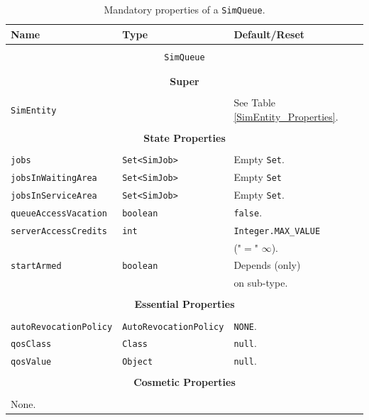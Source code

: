 \begin{table}[!htbp]
\caption{Mandatory properties of a \lstinline|SimQueue|.}
\label{SimQueue_Properties}
\begin{center}
\begin{tabular}{|l|l|l|}
\hline
{\bf Name} & {\bf Type} & {\bf Default/Reset} \\
\hline
\multicolumn{3}{|c|}{} \\
\multicolumn{3}{|c|}{\lstinline[basicstyle=\large]{SimQueue}} \\
\multicolumn{3}{|c|}{} \\
\hline
\multicolumn{3}{|c|}{} \\
\multicolumn{3}{|c|}{\bf Super} \\
\multicolumn{3}{|c|}{} \\
\hline
\multicolumn{2}{|l|}{\lstinline|SimEntity|}
  & See Table \ref{SimEntity_Properties}.
  \\
  \hline
\multicolumn{3}{|c|}{} \\
\multicolumn{3}{|c|}{\bf State Properties} \\
\multicolumn{3}{|c|}{} \\
\hline
\lstinline|jobs|
  & \lstinline|Set<SimJob>|
  & Empty \lstinline|Set|.
  \\ \hline
\lstinline|jobsInWaitingArea|
  & \lstinline|Set<SimJob>|
  & Empty \lstinline|Set|
  \\ \hline
\lstinline|jobsInServiceArea|
  & \lstinline|Set<SimJob>|
  & Empty \lstinline|Set|.
  \\
  \hline
\lstinline|queueAccessVacation|
  & \lstinline|boolean|
  & \lstinline|false|.
  \\
  \hline
\lstinline|serverAccessCredits|
  & \lstinline|int|
  & \lstinline|Integer.MAX_VALUE|
  \\
  &
  & ("$=$" $\infty$).
  \\ \hline
\lstinline|startArmed|
  & \lstinline|boolean|
  & Depends (only) \\
  &
  & on sub-type. \\ \hline
\multicolumn{3}{|c|}{} \\
\multicolumn{3}{|c|}{\bf Essential Properties} \\
\multicolumn{3}{|c|}{} \\
\hline
\lstinline|autoRevocationPolicy|
  & \lstinline|AutoRevocationPolicy|
  & \lstinline|NONE|.
  \\
  \hline
\lstinline|qosClass|
  & \lstinline|Class|
  & \lstinline|null|.
  \\
  \hline
\lstinline|qosValue|
  & \lstinline|Object|
  & \lstinline|null|.
  \\
  \hline
\multicolumn{3}{|c|}{} \\
\multicolumn{3}{|c|}{\bf Cosmetic Properties} \\
\multicolumn{3}{|c|}{} \\
\hline
\multicolumn{3}{|l|}{None.} \\
\hline
\end{tabular}
\end{center}
\end{table}

